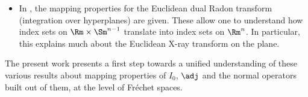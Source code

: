 \begin{itemize}
\begin{equation*}
\adj \, \mu^{-1} I_0 \colon \wtH^k(M) \To{\cong} \wtH^{k+1}(M).
\end{equation*}
In other words, by introducing the singular weight $\sfrac{1}{\mu}$, one can identify spaces which are stable under iteration of the modified
normal operator $\adj \, \mu^{-1} I_0$.
\item In \cite{Katsevich2001}, the mapping properties for the Euclidean dual Radon transform (\ie integration over hyperplanes) are given.
These allow one to understand how index sets on $\Rm\times \Sm^{n-1}$ translate into index sets on $\Rm^n$. In particular, this explains
much about the Euclidean X-ray transform on the plane.
\end{itemize}

The present work presents a first step towards a unified understanding of these various results about mapping properties of $I_0$, $\adj $
and the normal operators built out of them, at the level of Fréchet spaces.

